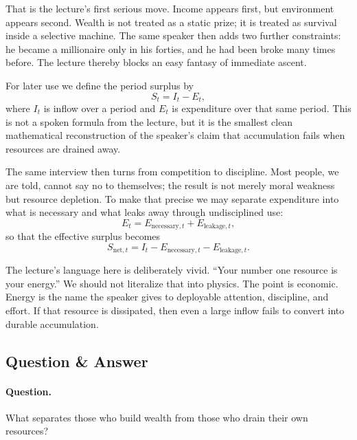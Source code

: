 That is the lecture's first serious move. Income appears first, but environment appears second. Wealth is not treated as a static prize; it is treated as survival inside a selective machine. The same speaker then adds two further constraints: he became a millionaire only in his forties, and he had been broke many times before. The lecture thereby blocks an easy fantasy of immediate ascent.

\begin{definition}
For later use we define the period surplus by
\begin{equation}
S_t = I_t - E_t,
\end{equation}
where \(I_t\) is inflow over a period and \(E_t\) is expenditure over that same period. This is not a spoken formula from the lecture, but it is the smallest clean mathematical reconstruction of the speaker's claim that accumulation fails when resources are drained away.
\end{definition}

The same interview then turns from competition to discipline. Most people, we are told, cannot say no to themselves; the result is not merely moral weakness but resource depletion. To make that precise we may separate expenditure into what is necessary and what leaks away through undisciplined use:
\begin{equation}
E_t = E_{\text{necessary},t} + E_{\text{leakage},t},
\end{equation}
so that the effective surplus becomes
\begin{equation}
S_{\text{net},t} = I_t - E_{\text{necessary},t} - E_{\text{leakage},t}.
\end{equation}

The lecture's language here is deliberately vivid. ``Your number one resource is your energy.'' We should not literalize that into physics. The point is economic. Energy is the name the speaker gives to deployable attention, discipline, and effort. If that resource is dissipated, then even a large inflow fails to convert into durable accumulation.

\subsection{Question \& Answer}

\paragraph{Question.} What separates those who build wealth from those who drain their own resources?

